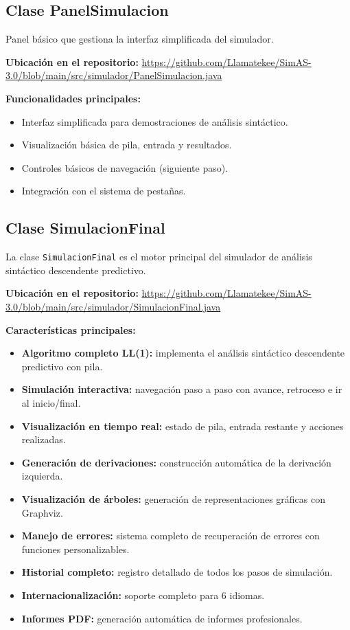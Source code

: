 \subsection{Clase PanelSimulacion}

Panel básico que gestiona la interfaz simplificada del simulador.

\textbf{Ubicación en el repositorio:} \url{https://github.com/Llamatekee/SimAS-3.0/blob/main/src/simulador/PanelSimulacion.java}

\textbf{Funcionalidades principales:}

\begin{itemize}
    \item Interfaz simplificada para demostraciones de análisis sintáctico.
    \item Visualización básica de pila, entrada y resultados.
    \item Controles básicos de navegación (siguiente paso).
    \item Integración con el sistema de pestañas.
\end{itemize}

\subsection{Clase SimulacionFinal}

La clase \texttt{SimulacionFinal} es el motor principal del simulador de análisis sintáctico descendente predictivo.

\textbf{Ubicación en el repositorio:} \url{https://github.com/Llamatekee/SimAS-3.0/blob/main/src/simulador/SimulacionFinal.java}

\textbf{Características principales:}

\begin{itemize}
    \item \textbf{Algoritmo completo LL(1):} implementa el análisis sintáctico descendente predictivo con pila.
    \item \textbf{Simulación interactiva:} navegación paso a paso con avance, retroceso e ir al inicio/final.
    \item \textbf{Visualización en tiempo real:} estado de pila, entrada restante y acciones realizadas.
    \item \textbf{Generación de derivaciones:} construcción automática de la derivación izquierda.
    \item \textbf{Visualización de árboles:} generación de representaciones gráficas con Graphviz.
    \item \textbf{Manejo de errores:} sistema completo de recuperación de errores con funciones personalizables.
    \item \textbf{Historial completo:} registro detallado de todos los pasos de simulación.
    \item \textbf{Internacionalización:} soporte completo para 6 idiomas.
    \item \textbf{Informes PDF:} generación automática de informes profesionales.
\end{itemize}

